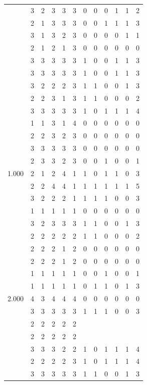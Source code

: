 \documentclass[]{msu-thesis}
\theoremstyle{definition}
\theoremstyle{definition}
\theoremstyle{definition}
\theoremstyle{remark}
\begin{document}
\begin{table}
{\begin{tabular}[t]{rrrrrrrrrrrr}
 & 3 & 2 & 3 & 3 & 3 & 0 & 0 & 0 & 1 & 1 & 2\\
 & 2 & 1 & 3 & 3 & 3 & 0 & 0 & 1 & 1 & 1 & 3\\
 & 3 & 1 & 3 & 2 & 3 & 0 & 0 & 0 & 0 & 1 & 1\\
 & 2 & 1 & 2 & 1 & 3 & 0 & 0 & 0 & 0 & 0 & 0\\
 & 3 & 3 & 3 & 3 & 3 & 1 & 0 & 0 & 1 & 1 & 3\\
 & 3 & 3 & 3 & 3 & 3 & 1 & 0 & 0 & 1 & 1 & 3\\
 & 3 & 2 & 2 & 2 & 3 & 1 & 1 & 0 & 0 & 1 & 3\\
 & 2 & 2 & 3 & 1 & 3 & 1 & 1 & 0 & 0 & 0 & 2\\
 & 3 & 3 & 3 & 3 & 3 & 1 & 0 & 1 & 1 & 1 & 4\\
 & 1 & 1 & 3 & 1 & 4 & 0 & 0 & 0 & 0 & 0 & 0\\
 & 2 & 2 & 3 & 2 & 3 & 0 & 0 & 0 & 0 & 0 & 0\\
 & 3 & 3 & 3 & 3 & 3 & 0 & 0 & 0 & 0 & 0 & 0\\
 & 2 & 3 & 3 & 2 & 3 & 0 & 0 & 1 & 0 & 0 & 1\\
1.000 & 2 & 1 & 2 & 4 & 1 & 1 & 0 & 1 & 1 & 0 & 3\\
 & 2 & 2 & 4 & 4 & 1 & 1 & 1 & 1 & 1 & 1 & 5\\
 & 3 & 2 & 2 & 2 & 1 & 1 & 1 & 1 & 0 & 0 & 3\\
 & 1 & 1 & 1 & 1 & 1 & 0 & 0 & 0 & 0 & 0 & 0\\
 & 3 & 2 & 3 & 3 & 3 & 1 & 1 & 0 & 0 & 1 & 3\\
 & 2 & 2 & 2 & 2 & 2 & 1 & 1 & 0 & 0 & 0 & 2\\
 & 2 & 2 & 2 & 1 & 2 & 0 & 0 & 0 & 0 & 0 & 0\\
 & 2 & 2 & 2 & 1 & 2 & 0 & 0 & 0 & 0 & 0 & 0\\
 & 1 & 1 & 1 & 1 & 1 & 0 & 0 & 1 & 0 & 0 & 1\\
 & 1 & 1 & 1 & 1 & 1 & 0 & 1 & 1 & 0 & 1 & 3\\
2.000 & 4 & 3 & 4 & 4 & 4 & 0 & 0 & 0 & 0 & 0 & 0\\
 & 3 & 3 & 3 & 3 & 3 & 1 & 1 & 1 & 0 & 0 & 3\\
 & 2 & 2 & 2 & 2 & 2 &  &  &  &  &  & \\
 & 2 & 2 & 2 & 2 & 2 &  &  &  &  &  & \\
 & 3 & 3 & 3 & 2 & 2 & 1 & 0 & 1 & 1 & 1 & 4\\
 & 2 & 2 & 2 & 2 & 3 & 1 & 0 & 1 & 1 & 1 & 4\\
 & 3 & 3 & 3 & 3 & 3 & 1 & 1 & 0 & 0 & 1 & 3\\

\end{tabular}}
\end{table}
\end{document}
